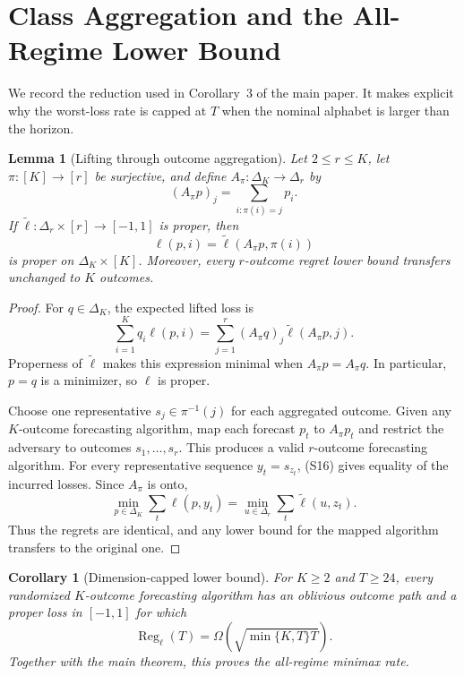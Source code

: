 \documentclass[twoside]{article}
\newtheorem{lemma}[theorem]{Lemma}
\newtheorem{corollary}[theorem]{Corollary}
\newcommand{\Reg}{\operatorname{Reg}}
\begin{document}
\section{Class Aggregation and the All-Regime Lower Bound}

We record the reduction used in Corollary~3 of the main paper. It makes explicit why the worst-loss rate is capped at $T$ when the nominal alphabet is larger than the horizon.

\begin{lemma}[Lifting through outcome aggregation]
\label{lem:aggregation}
Let $2\leq r\leq K$, let $\pi:[K]\to[r]$ be surjective, and define $A_\pi:\Delta_K\to\Delta_r$ by
\[
(A_\pi p)_j=\sum_{i:\pi(i)=j}p_i.
\]
If $\widetilde\ell:\Delta_r\times[r]\to[-1,1]$ is proper, then
\[
\ell(p,i)=\widetilde\ell(A_\pi p,\pi(i))
\tag{S16}
\]
is proper on $\Delta_K\times[K]$. Moreover, every $r$-outcome regret lower bound transfers unchanged to $K$ outcomes.
\end{lemma}

\begin{proof}
For $q\in\Delta_K$, the expected lifted loss is
\[
\sum_{i=1}^Kq_i\ell(p,i)
=\sum_{j=1}^r(A_\pi q)_j\widetilde\ell(A_\pi p,j).
\]
Properness of $\widetilde\ell$ makes this expression minimal when $A_\pi p=A_\pi q$. In particular, $p=q$ is a minimizer, so $\ell$ is proper.

Choose one representative $s_j\in\pi^{-1}(j)$ for each aggregated outcome. Given any $K$-outcome forecasting algorithm, map each forecast $p_t$ to $A_\pi p_t$ and restrict the adversary to outcomes $s_1,\ldots,s_r$. This produces a valid $r$-outcome forecasting algorithm. For every representative sequence $y_t=s_{z_t}$, (S16) gives equality of the incurred losses. Since $A_\pi$ is onto,
\[
\min_{p\in\Delta_K}\sum_t\ell(p,y_t)
=\min_{u\in\Delta_r}\sum_t\widetilde\ell(u,z_t).
\]
Thus the regrets are identical, and any lower bound for the mapped algorithm transfers to the original one.
\end{proof}

\begin{corollary}[Dimension-capped lower bound]
\label{cor:all-regime}
For $K\geq2$ and $T\geq24$, every randomized $K$-outcome forecasting algorithm has an oblivious outcome path and a proper loss in $[-1,1]$ for which
\[
\Reg_\ell(T)
=\Omega\!\left(\sqrt{\min\{K,T\}T}\right).
\tag{S17}
\]
Together with the main theorem, this proves the all-regime minimax rate.
\end{corollary}
\end{document}
